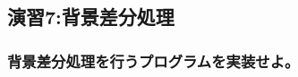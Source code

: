 ﻿\documentclass[a4j,11pt]{jarticle}
\begin{document}



\subsection{演習7:背景差分処理}

\subsubsection{背景差分処理を行うプログラムを実装せよ。}
\end{document}
